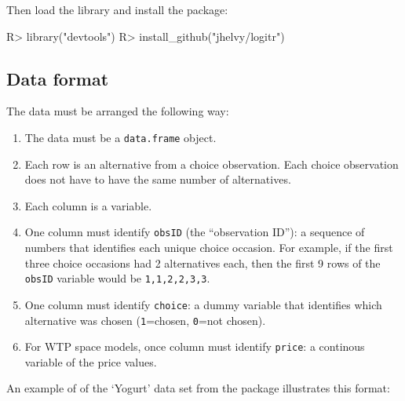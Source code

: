 \documentclass[article]{jss}
\providecommand{\tightlist}{%
  \setlength{\itemsep}{0pt}\setlength{\parskip}{0pt}}
\begin{document}
Then load the  library and install the 
package:

\begin{CodeChunk}

\begin{CodeInput}
R> library("devtools")
R> install_github("jhelvy/logitr")
\end{CodeInput}
\end{CodeChunk}

\hypertarget{data-format}{%
\subsection{Data format}\label{data-format}}

The data must be arranged the following way:

\begin{enumerate}
\def\labelenumi{\arabic{enumi}.}
\tightlist
\item
  The data must be a \texttt{data.frame} object.
\item
  Each row is an alternative from a choice observation. Each choice
  observation does not have to have the same number of alternatives.
\item
  Each column is a variable.
\item
  One column must identify \texttt{obsID} (the ``observation ID''): a
  sequence of numbers that identifies each unique choice occasion. For
  example, if the first three choice occasions had 2 alternatives each,
  then the first 9 rows of the \texttt{obsID} variable would be
  \texttt{1,1,2,2,3,3}.
\item
  One column must identify \texttt{choice}: a dummy variable that
  identifies which alternative was chosen (\texttt{1}=chosen,
  \texttt{0}=not chosen).
\item
  For WTP space models, once column must identify \texttt{price}: a
  continous variable of the price values.
\end{enumerate}

An example of of the `Yogurt' data set from the  package
illustrates this format:
\end{document}
